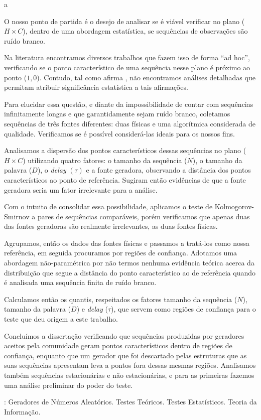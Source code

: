 a\documentclass[tcc]{ic}
\begin{document}
\begin{resumo}
\noindent 
O nosso ponto de partida é o desejo de analisar
se é viável verificar no plano ($H\times C$), dentro de uma abordagem estatística, se sequências de observações são ruído branco.

Na literatura encontramos diversos trabalhos que fazem isso de forma ``ad hoc'', verificando se o ponto característico de uma sequência nesse plano é próximo ao ponto ($1,0$). 
Contudo, tal como afirma \citet{NewPermutationEntropy}, não encontramos análises detalhadas que permitam atribuir significância estatística a tais afirmações.

Para elucidar essa questão, e diante da impossibilidade de contar com sequências infinitamente longas e que garantidamente sejam ruído branco, coletamos sequências de três fontes diferentes: duas físicas e uma algorítmica considerada de qualidade.
Verificamos se é possível considerá-las ideais para os nossos fins.

Analisamos a dispersão dos pontos característicos dessas sequências no plano ($H\times C$) utilizando quatro fatores: o tamanho da sequência ($N$), o tamanho da palavra ($D$), o \textit{delay} $(\tau)$ e a fonte geradora, observando a distância dos pontos característicos ao ponto de referência. Sugiram então evidências de que a fonte geradora seria um fator irrelevante para a análise.

Com o intuito de consolidar essa possibilidade, aplicamos o teste de Kolmogorov-Smirnov a pares de sequências comparáveis, porém verificamos que apenas duas das fontes geradoras são realmente irrelevantes, as duas fontes físicas.

Agrupamos, então os dados das fontes físicas e passamos a tratá-los como nossa referência, em seguida procuramos por regiões de confiança. 
Adotamos uma abordagem não-paramétrica por não termos nenhuma evidência teórica acerca da distribuição que segue a distância do ponto característico ao de referência quando é analisada uma sequência finita de ruído branco.

Calculamos então os quantis, respeitados os fatores tamanho da sequência ($N$), tamanho da palavra ($D$) e \textit{delay} ($\tau$), que servem como regiões de confiança para o teste que deu origem a este trabalho.

Concluímos a dissertação verificando que sequências produzidas por geradores aceitos pela comunidade geram pontos característicos dentro de regiões de confiança, enquanto que um gerador que foi descartado pelas estruturas que as suas sequências apresentam leva a pontos fora dessas mesmas regiões.
Analisamos também sequências estacionárias e não estacionárias, e para as primeiras fazemos uma análise preliminar do poder do teste.

\vspace{1em}
: Geradores de Números Aleatórios. Testes Teóricos. Testes Estatísticos. Teoria da Informação.
\end{resumo}
\end{document}
